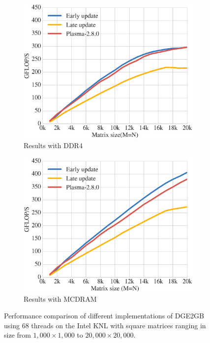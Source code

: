 \begin{figure}[h!]
  \begin{subfigure}[t]{0.5 \textwidth}
    \includegraphics[width=\textwidth]{fig/dge2gb_KNL}
    \caption{\label{fig:dge2gb_DDR4}
      Results with DDR4}
  \end{subfigure}
  \hfill
  \begin{subfigure}[t]{0.5 \textwidth}
    \includegraphics[width=\textwidth]{fig/dge2gb_KNL_HBW}
    \caption{\label{fig:dge2gb_HBW}
      Results with MCDRAM}
  \end{subfigure}
  \caption{Performance comparison of different implementations of
    DGE2GB using $68$ threads on the Intel KNL with square matrices
    ranging in size from $1,000 \times 1,000$ to $20,000 \times
    20,000$.}
  \label{fig:dge2gb_KNL}
\end{figure}


